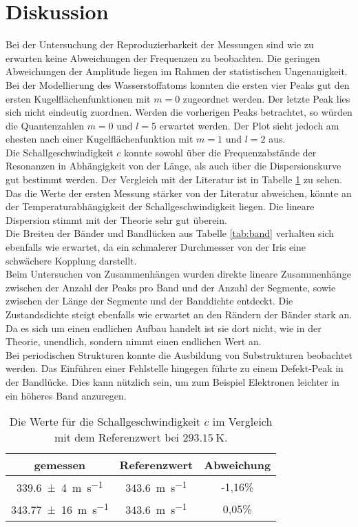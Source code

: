 
\section{Diskussion}
\label{sec:Diskussion}

Bei der Untersuchung der Reproduzierbarkeit der Messungen sind wie zu erwarten keine Abweichungen der Frequenzen zu beobachten. Die geringen Abweichungen der Amplitude liegen im Rahmen der statistischen Ungenauigkeit.\\
Bei der Modellierung des Wasserstoffatoms konnten die ersten vier Peaks gut den ersten Kugelflächenfunktionen mit $m=0$ zugeordnet werden. Der letzte Peak lies sich nicht eindeutig zuordnen. Werden die vorherigen Peaks betrachtet, so würden die Quantenzahlen $m=0$ und $l=5$ erwartet werden. Der Plot sieht jedoch am ehesten nach einer Kugelflächenfunktion mit $m=1$ und $l=2$ aus. \\
Die Schallgeschwindigkeit $c$ konnte sowohl über die Frequenzabstände der Resonanzen in Abhängigkeit von der Länge, als auch über die Dispersionskurve gut bestimmt werden. Der Vergleich mit der Literatur ist in Tabelle \ref{tab:Diskussion} zu sehen. Das die Werte der ersten Messung stärker von der Literatur abweichen, könnte an der Temperaturabhängigkeit der Schallgeschwindigkeit liegen. Die lineare Dispersion stimmt mit der Theorie sehr gut überein.\\
Die Breiten der Bänder und Bandlücken aus Tabelle \ref{tab:band} verhalten sich ebenfalls wie erwartet, da ein schmalerer Durchmesser von der Iris eine schwächere Kopplung darstellt.\\
Beim Untersuchen von Zusammenhängen wurden direkte lineare Zusammenhänge zwischen der Anzahl der Peaks pro Band und der Anzahl der Segmente, sowie zwischen der Länge der Segmente und der Banddichte entdeckt. Die Zustandsdichte steigt ebenfalls wie erwartet an den Rändern der Bänder stark an. Da es sich um einen endlichen Aufbau handelt ist sie dort nicht, wie in der Theorie, unendlich, sondern nimmt einen endlichen Wert an.\\
Bei periodischen Strukturen konnte die Ausbildung von Substrukturen beobachtet werden. Das Einführen einer Fehlstelle hingegen führte zu einem Defekt-Peak in der Bandlücke. Dies kann nützlich sein, um zum Beispiel Elektronen leichter in ein höheres Band anzuregen.

\begin{table}
\centering
	\caption{Die Werte für die Schallgeschwindigkeit $c$ im Vergleich mit dem Referenzwert \cite{cLuft} bei $\SI{293,15}{\kelvin}$.}
	\label{tab:Diskussion}
	\begin{tabular}{ccc}
		\toprule
		{gemessen}&{Referenzwert\cite{cLuft}}&{Abweichung} \\
		\midrule
		\SI{339,6(4)}{\metre\per\second}   & \SI{343,6}{\metre\per\second} & -1,16\%\\
		\SI{343,77(16)}{\metre\per\second} & \SI{343,6}{\metre\per\second} & 0,05\%\\
		\bottomrule
	\end{tabular}
\end{table}